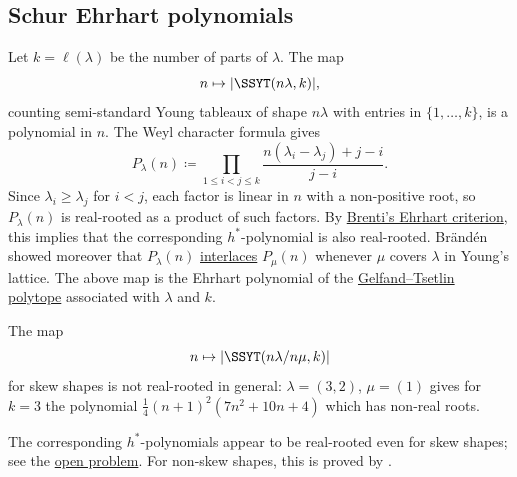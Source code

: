 \subsection[schurEhrhartRealRooted]{Schur Ehrhart polynomials}

\begin{example*}

Let $k = \ell(\lambda)$ be the number of parts of $\lambda$.
The map
\[
 n \mapsto |\SSYT(n \lambda, k)|,
\]
counting semi-standard Young tableaux of shape $n\lambda$ with entries in $\{1,\dotsc,k\}$,
is a polynomial in $n$. The Weyl character formula gives
\[
  P_\lambda(n) \coloneqq  \prod_{1 \leq i \lt j \leq k} \frac{n(\lambda_i - \lambda_j)+j-i}{j-i}.
\]
Since $\lambda_i \geq \lambda_j$ for $i < j$, each factor is linear in $n$ with a non-positive root,
so $P_\lambda(n)$ is real-rooted as a product of such factors.
By \hyperref[brentiEhrhartCriterion]{Brenti's Ehrhart criterion}, this implies
that the corresponding $h^*$-polynomial is also real-rooted.
Brändén \cite{Branden2004operators} showed moreover that $P_\lambda(n)$
\hyperref[interlacingPolynomials]{interlaces} $P_\mu(n)$ whenever $\mu$ covers $\lambda$ in Young's lattice.
The above map is the Ehrhart polynomial of the \hyperref[gtpatterns]{Gelfand--Tsetlin polytope} associated with $\lambda$ and $k$.


The map
\[
 n \mapsto |\SSYT(n \lambda/ n\mu, k)|
\]
for skew shapes is not real-rooted in general: $\lambda =(3,2)$, $\mu = (1)$ gives for $k=3$
the polynomial $\frac{1}{4} (n+1)^2 \left(7 n^2+10 n+4\right)$ which has non-real roots.

The corresponding $h^*$-polynomials appear to be real-rooted even for skew
shapes; see the \hyperref[conjSkewSchurHStar]{open problem}.
For non-skew shapes, this is proved by  \cite{Brenti1989}.
\end{example*}

